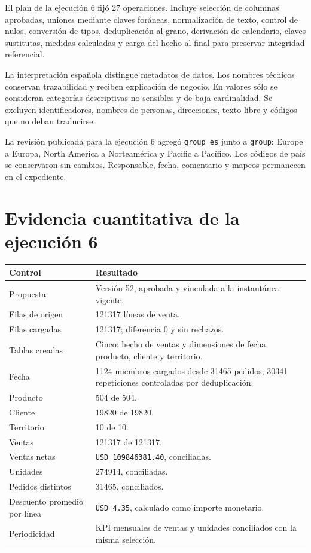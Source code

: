 \documentclass[11pt,letterpaper]{article}
\newcommand{\file}[1]{\texttt{#1}}
\begin{document}
El plan de la ejecución 6 fijó 27 operaciones. Incluye selección de columnas aprobadas, uniones mediante claves foráneas, normalización de texto, control de nulos, conversión de tipos, deduplicación al grano, derivación de calendario, claves sustitutas, medidas calculadas y carga del hecho al final para preservar integridad referencial.

La interpretación española distingue metadatos de datos. Los nombres técnicos conservan trazabilidad y reciben explicación de negocio. En valores sólo se consideran categorías descriptivas no sensibles y de baja cardinalidad. Se excluyen identificadores, nombres de personas, direcciones, texto libre y códigos que no deban traducirse.

La revisión publicada para la ejecución 6 agregó \file{group\_es} junto a \file{group}: Europe a Europa, North America a Norteamérica y Pacific a Pacífico. Los códigos de país se conservaron sin cambios. Responsable, fecha, comentario y mapeos permanecen en el expediente.

\section{Evidencia cuantitativa de la ejecución 6}

\begin{tabularx}{\textwidth}{@{}p{}X@{}}
  \toprule
  Control & Resultado \\
  \midrule
  Propuesta & Versión 52, aprobada y vinculada a la instantánea vigente. \\
  Filas de origen & 121317 líneas de venta. \\
  Filas cargadas & 121317; diferencia 0 y sin rechazos. \\
  Tablas creadas & Cinco: hecho de ventas y dimensiones de fecha, producto, cliente y territorio. \\
  Fecha & 1124 miembros cargados desde 31465 pedidos; 30341 repeticiones controladas por deduplicación. \\
  Producto & 504 de 504. \\
  Cliente & 19820 de 19820. \\
  Territorio & 10 de 10. \\
  Ventas & 121317 de 121317. \\
  Ventas netas & \file{USD 109846381.40}, conciliadas. \\
  Unidades & 274914, conciliadas. \\
  Pedidos distintos & 31465, conciliados. \\
  Descuento promedio por línea & \file{USD 4.35}, calculado como importe monetario. \\
  Periodicidad & KPI mensuales de ventas y unidades conciliados con la misma selección. \\
  \bottomrule
\end{tabularx}
\end{document}
